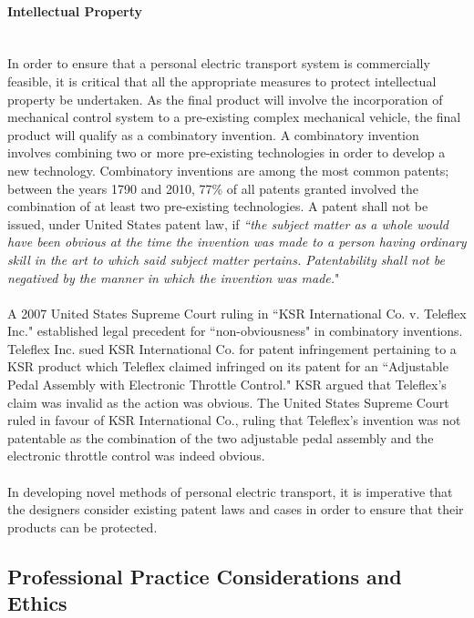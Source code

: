 \paragraph{Intellectual Property}\mbox{}\\
In order to ensure that a personal electric transport system is commercially feasible, it is critical that all the appropriate measures to protect intellectual property be undertaken. 
As the final product will involve the incorporation of mechanical control system to a pre-existing complex mechanical vehicle, the final product will qualify as a combinatory invention. 
A combinatory invention involves combining two or more pre-existing technologies in order to develop a new technology. 
Combinatory inventions are among the most common patents; between the years 1790 and 2010, 77\% of all patents granted involved the combination of at least two pre-existing technologies. \cite{COMB} 
A patent shall not be issued, under United States patent law, if \emph{“the subject matter as a whole would have been obvious at the time the invention was made to a person having ordinary skill in the art to which said subject matter pertains. 
Patentability shall not be negatived by the manner in which the invention was made.}" \cite{NonObv} 
\\
\\
A 2007 United States Supreme Court ruling in “KSR International Co. v. Teleflex Inc." established legal precedent for “non-obviousness" in combinatory inventions. 
Teleflex Inc. sued KSR International Co. for patent infringement pertaining to a KSR product which Teleflex claimed infringed on its patent for an “Adjustable Pedal Assembly with Electronic Throttle Control."
KSR argued that Teleflex's claim was invalid as the action was obvious. 
The United States Supreme Court ruled in favour of KSR International Co.,  
ruling that Teleflex's invention was not patentable as the combination of the two adjustable pedal assembly and the electronic throttle control was indeed obvious. 
\\
\\
In developing novel methods of personal electric transport, it is imperative that the designers consider existing patent laws and cases in order to ensure that their products can be protected.

\subsection{Professional Practice Considerations and Ethics}

